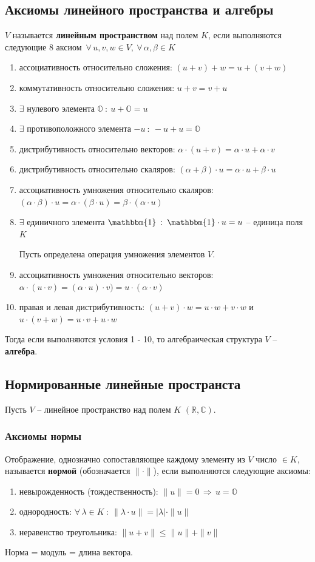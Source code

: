 \documentclass{article}
\newcommand{\R}{\mathbb R}
\begin{document}
\subsection{Аксиомы линейного пространства и алгебры}
$V$ называется \textbf{линейным пространством} над полем $K$, если выполняются следующие 8 аксиом $\,\forall\,u,v,w\in V,\:\forall\,\alpha,\beta\in K$
\begin{enumerate}
    \item ассоциативность относительно сложения: $(u+v)+w=u+(v+w)$
    \item коммутативность относительно сложения: $u+v=v+u$
    \item $\exists$ нулевого элемента $\mathbb{O}\::\:u+\mathbb{O}=u$
    \item $\exists$ противоположного элемента $-u\::\:-u+u=\mathbb{O}$
    \item дистрибутивность относительно векторов: $\alpha\cdot(u+v)=\alpha\cdot u+\alpha\cdot v$
    \item дистрибутивность относительно скаляров: $(\alpha+\beta)\cdot u=\alpha\cdot u+\beta\cdot u$
    \item ассоциативность умножения относительно скаляров: $(\alpha\cdot\beta)\cdot u=\alpha\cdot(\beta\cdot u)=\beta\cdot(\alpha\cdot u)$
    \item $\exists$ единичного элемента $\mathbbm{1}\::\:\mathbbm{1}\cdot u=u$ -- единица поля $K$
    
    Пусть определена операция умножения элементов $V$.
    \item ассоциативность умножения относительно векторов: $\alpha\cdot(u\cdot v)=(\alpha\cdot u)\cdot v)=u\cdot(\alpha\cdot v)$
    \item правая и левая дистрибутивность: $(u+v)\cdot w=u\cdot w+v\cdot w$ и $u\cdot(v+w)=u\cdot v+u\cdot w$
\end{enumerate}
Тогда если выполняются условия 1 - 10, то алгебраическая структура $V$ -- \textbf{алгебра}.

\subsection{Нормированные линейные пространста}
Пусть $V$ -- линейное пространство над полем $K$ $(\R,\mathbb{C})$.
\subsubsection{Аксиомы нормы}
Отображение, однозначно сопоставляющее каждому элементу из $V$ число $\in K$, называется \textbf{нормой} (обозначается $\|\cdot\|$), если выполняются следующие аксиомы:
\begin{enumerate}
    \item невырожденность (тождественность): $\|u\|=0\,\Rightarrow\,u=\mathbb{O}$
    \item однородность: $\forall \,\lambda\in K\::\:\|\lambda\cdot u\|=|\lambda|\cdot\|u\|$
    \item неравенство треугольника: $\|u+v\|\leqslant\|u\|+\|v\|$
\end{enumerate}
Норма = модуль = длина вектора.
\end{document}
